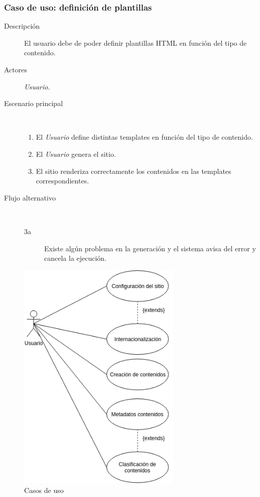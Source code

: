 \subsubsection{Caso de uso: definición de plantillas}

\begin{description}
    \item[Descripción] El usuario debe de poder definir plantillas HTML en función del tipo de contenido.
    \item[Actores] \textit{Usuario}.
    \item[Escenario principal] $\quad$
        \begin{enumerate}
            \item El \textit{Usuario} define distintas templates en función del tipo de contenido.
            \item El \textit{Usuario} genera el sitio.
            \item El sitio renderiza correctamente los contenidos en las templates correspondientes.
        \end{enumerate}
    \item[Flujo alternativo] $\quad$
        \begin{description}
            \item[3a] Existe algún problema en la generación y el sistema avisa del error
                y cancela la ejecución.
        \end{description}
\end{description}

\begin{figure}[h]
    \centering
    \includegraphics[width=0.7\textwidth]{4_analisis/casos_de_uso}
    \caption{Casos de uso}
    \label{fig:actores}
\end{figure}


